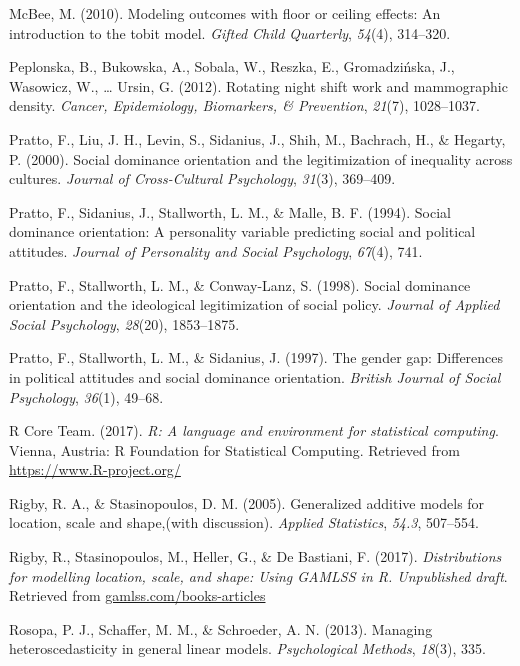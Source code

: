 \documentclass[english,man]{apa6}
\theoremstyle{definition}
\theoremstyle{definition}
\theoremstyle{remark}
\begin{document}
\hypertarget{ref-mcbee2010modeling}{}
McBee, M. (2010). Modeling outcomes with floor or ceiling effects: An
introduction to the tobit model. \emph{Gifted Child Quarterly},
\emph{54}(4), 314--320.

\hypertarget{ref-peplonska2012rotating}{}
Peplonska, B., Bukowska, A., Sobala, W., Reszka, E., Gromadzińska, J.,
Wasowicz, W., \ldots{} Ursin, G. (2012). Rotating night shift work and
mammographic density. \emph{Cancer, Epidemiology, Biomarkers, \&
Prevention}, \emph{21}(7), 1028--1037.

\hypertarget{ref-pratto2000social}{}
Pratto, F., Liu, J. H., Levin, S., Sidanius, J., Shih, M., Bachrach, H.,
\& Hegarty, P. (2000). Social dominance orientation and the
legitimization of inequality across cultures. \emph{Journal of
Cross-Cultural Psychology}, \emph{31}(3), 369--409.

\hypertarget{ref-pratto1994social}{}
Pratto, F., Sidanius, J., Stallworth, L. M., \& Malle, B. F. (1994).
Social dominance orientation: A personality variable predicting social
and political attitudes. \emph{Journal of Personality and Social
Psychology}, \emph{67}(4), 741.

\hypertarget{ref-pratto1998social}{}
Pratto, F., Stallworth, L. M., \& Conway-Lanz, S. (1998). Social
dominance orientation and the ideological legitimization of social
policy. \emph{Journal of Applied Social Psychology}, \emph{28}(20),
1853--1875.

\hypertarget{ref-pratto1997gender}{}
Pratto, F., Stallworth, L. M., \& Sidanius, J. (1997). The gender gap:
Differences in political attitudes and social dominance orientation.
\emph{British Journal of Social Psychology}, \emph{36}(1), 49--68.

\hypertarget{ref-rcore2017}{}
R Core Team. (2017). \emph{R: A language and environment for statistical
computing}. Vienna, Austria: R Foundation for Statistical Computing.
Retrieved from \url{https://www.R-project.org/}

\hypertarget{ref-rigby2005generalized}{}
Rigby, R. A., \& Stasinopoulos, D. M. (2005). Generalized additive
models for location, scale and shape,(with discussion). \emph{Applied
Statistics}, \emph{54.3}, 507--554.

\hypertarget{ref-rigby2017distributions}{}
Rigby, R., Stasinopoulos, M., Heller, G., \& De Bastiani, F. (2017).
\emph{Distributions for modelling location, scale, and shape: Using
GAMLSS in R. Unpublished draft}. Retrieved from
\url{gamlss.com/books-articles}

\hypertarget{ref-rosopa2013managing}{}
Rosopa, P. J., Schaffer, M. M., \& Schroeder, A. N. (2013). Managing
heteroscedasticity in general linear models. \emph{Psychological
Methods}, \emph{18}(3), 335.
\end{document}
